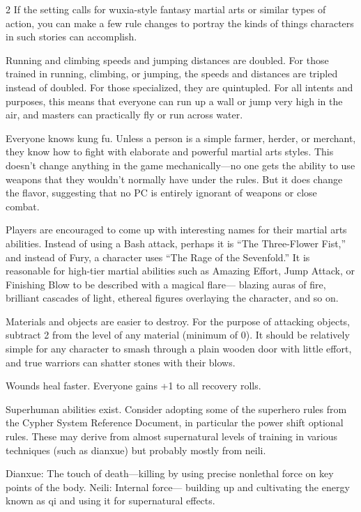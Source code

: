 \begin{multicols}{2}
If the setting calls for wuxia-style fantasy martial arts or similar types of action, you can make a few rule changes to portray the kinds of things characters in such stories can accomplish.

Running and climbing speeds and jumping distances are doubled. For those trained in running, climbing, or jumping, the speeds and distances are tripled instead of doubled. For those specialized, they are quintupled. For all intents and purposes, this means that everyone can run up a wall or jump very high in the air, and masters can practically fly or run across water.

Everyone knows kung fu. Unless a person is a simple farmer, herder, or merchant, they know how to fight with elaborate and powerful martial arts styles. This doesn’t change anything in the game mechanically—no one gets the ability to use weapons that they wouldn’t normally have under the rules. But it does change the flavor, suggesting that no PC is entirely ignorant of weapons or close combat. 

Players are encouraged to come up with interesting names for their martial arts abilities. Instead of using a Bash attack, perhaps it is “The Three-Flower Fist,” and instead of Fury, a character uses “The Rage of the Sevenfold.” It is reasonable for high-tier martial abilities such as Amazing Effort, Jump Attack, or Finishing Blow to be described with a magical flare— blazing auras of fire, brilliant cascades of light, ethereal figures overlaying the character, and so on. 

Materials and objects are easier to destroy. For the purpose of attacking objects, subtract 2 from the level of any material (minimum of 0). It should be relatively simple for any character to smash through a plain wooden door with little effort, and true warriors can shatter stones with their blows. 

Wounds heal faster. Everyone gains +1 to all recovery rolls. 

Superhuman abilities exist. Consider adopting some of the superhero rules from the Cypher System Reference Document, in particular the power shift optional rules. These may derive from almost supernatural levels of training in various techniques (such as dianxue) but probably mostly from neili.

Dianxue: The touch of death—killing by using precise nonlethal force on key points of the body. Neili: Internal force— building up and cultivating the energy known as qi and using it for supernatural effects.


\end{multicols}
